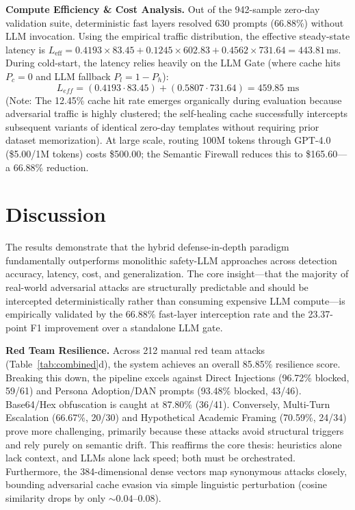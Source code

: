 \documentclass[conference]{IEEEtran}
\begin{document}
\textbf{Compute Efficiency \& Cost Analysis.} Out of the
942-sample zero-day validation suite, deterministic fast layers
resolved 630 prompts (66.88\%) without LLM invocation. Using the
empirical traffic distribution, the effective steady-state latency
is $L_{\text{eff}} = 0.4193 \times 83.45 + 0.1245 \times 602.83 +
0.4562 \times 731.64 = 443.81$\,ms. During cold-start, the latency relies heavily on the LLM Gate (where cache hits $P_c=0$ and LLM fallback $P_l=1-P_h$):
\[ L_{eff} = (0.4193 \cdot 83.45) + (0.5807 \cdot 731.64) = 459.85 \text{ ms} \]
(Note: The 12.45\% cache hit rate emerges organically during evaluation because adversarial traffic is highly clustered; the self-healing cache successfully intercepts subsequent variants of identical zero-day templates without requiring prior dataset memorization).
At large scale, routing
100M tokens through GPT-4.0 (\$5.00/1M tokens) costs \$500.00; the
Semantic Firewall reduces this to \$165.60---a 66.88\% reduction.

\section{Discussion}

The results demonstrate that the hybrid defense-in-depth paradigm
fundamentally outperforms monolithic safety-LLM approaches across
detection accuracy, latency, cost, and generalization. The core
insight---that the majority of real-world adversarial attacks are
structurally predictable and should be intercepted deterministically
rather than consuming expensive LLM compute---is empirically
validated by the 66.88\% fast-layer interception rate and the
23.37-point F1 improvement over a standalone LLM gate.

\textbf{Red Team Resilience.} Across 212 manual red team attacks (Table~\ref{tab:combined}d), the system achieves an overall 85.85\% resilience score. Breaking this down, the pipeline excels against Direct Injections (96.72\% blocked, 59/61) and Persona Adoption/DAN prompts (93.48\% blocked, 43/46). Base64/Hex obfuscation is caught at 87.80\% (36/41). Conversely, Multi-Turn Escalation (66.67\%, 20/30) and Hypothetical Academic Framing (70.59\%, 24/34) prove more challenging, primarily because these attacks avoid structural triggers and rely purely on semantic drift. This reaffirms the core thesis: heuristics alone lack context, and LLMs alone lack speed; both must be orchestrated. Furthermore, the 384-dimensional dense vectors map synonymous attacks closely, bounding adversarial cache evasion via simple linguistic perturbation (cosine similarity drops by only $\sim 0.04$--$0.08$).
\end{document}
